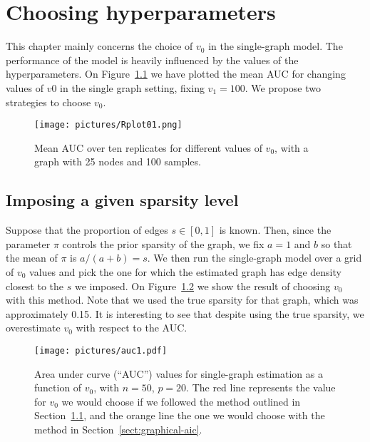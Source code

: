 \documentclass[a4paper, 11pt, oneside]{report}
\newcommand{\1}{\mathds{1}}
\begin{document}
\chapter{Choosing hyperparameters}\label{chap:hyperparameters}
This chapter mainly concerns the choice of $v_0$ in the single-graph model.
The performance of the model is heavily influenced by the values of the
hyperparameters.
On Figure~\ref{fig:mean_auc} we have plotted the mean AUC for
changing values of $v0$ in the single graph setting, fixing $v_1 = 100$.
We propose two strategies to choose $v_0$.
\begin{figure}[ht]
	\centering
	\texttt{[image: pictures/Rplot01.png]}
	\caption{Mean AUC over ten replicates for different values of $v_0$, with a
		graph with 25 nodes and 100 samples.}\label{fig:mean_auc}
\end{figure}

\section{Imposing a given sparsity level}\label{sect:imposing-sparsity}
Suppose that the proportion of edges $s \in [0,1]$ is known.
Then, since the parameter $\pi$ controls the prior sparsity of the graph, we 
fix $a = 1$ and $b$ so that the mean of $\pi$ is $a / (a+b) = s$. 
We then run the single-graph model over a grid of $v_0$ values and pick the one 
for which the estimated graph has edge density closest to the $s$ we imposed.
On Figure~\ref{fig:auc} we show the result of choosing $v_0$ with this method.
Note that we used the true sparsity for that graph, which was approximately 0.15.
It is interesting to see that despite using the true sparsity, we overestimate
$v_0$ with respect to the AUC.
\begin{figure}[ht]
  \begin{center}
    \texttt{[image: pictures/auc1.pdf]}
  \end{center}
  \caption{Area under curve (``AUC'') values for single-graph estimation as a function of $v_0$, with $n=50$, $p=20$.
    The red line represents the value for $v_0$ we would choose if we followed the method outlined in Section~\ref{sect:imposing-sparsity},
    and the orange line the one we would choose with the method in Section~\ref{sect:graphical-aic}.
}
  \label{fig:auc}
\end{figure}
\end{document}
